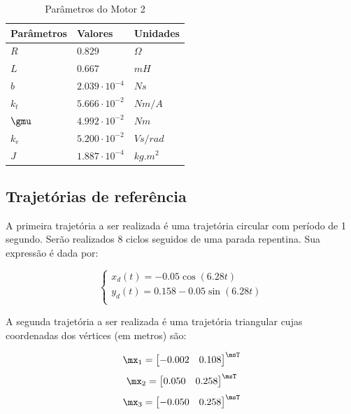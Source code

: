 \documentclass[]{politex}
\begin{document}
\begin{table}[H] 
\centering
\caption{Parâmetros do Motor 2}
\label{parametrosMotor2}
\begin{tabular}{l|l|l}
Parâmetros & Valores               & Unidades   \\ \hline
$R$        & $0.829$               & $\Omega$   \\
$L$        & $0.667$               & $mH$       \\
$b$        & $2.039 \cdot 10^{-4}$ & $N s$      \\
$k_{t}$    & $5.666 \cdot 10^{-2}$ & $Nm/A$     \\
$\gmu$     & $4.992 \cdot 10^{-2}$ & $Nm$        \\
$k_{e}$    & $5.200 \cdot 10^{-2}$ & $V s/rad$  \\
$J$        & $1.887 \cdot10^{-4}$  & $kg.m^{2}$
\end{tabular}
\end{table}

\subsection{Trajetórias de referência}

A primeira trajetória a ser realizada é uma trajetória circular com período de 1 segundo. Serão realizados 8 ciclos seguidos de uma parada repentina. Sua expressão é dada por:

\begin{equation}
\begin{cases}
x_d(t) = -0.05 \cos(6.28 t) \\
y_d(t) = 0.158 - 0.05 \sin(6.28 t) \\
\end{cases}
\end{equation}

A segunda trajetória a ser realizada é uma trajetória triangular cujas coordenadas dos vértices (em metros) são:

\begin{equation} \label{eq:zeroMaquina}
\mx_1 = \begin{bmatrix}
-0.002 & 0.108 
\end{bmatrix}^\msT
\end{equation}
\begin{equation}
\mx_2 = \begin{bmatrix}
0.050 & 0.258 
\end{bmatrix}^\msT
\end{equation}
\begin{equation}
\mx_3 = \begin{bmatrix}
-0.050 & 0.258 
\end{bmatrix}^\msT
\end{equation}
\end{document}
